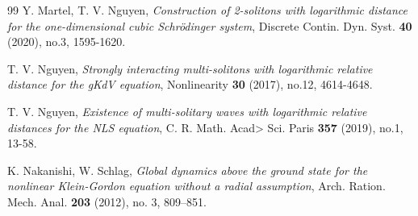 \documentclass[reqno]{amsart}
\theoremstyle{plain}
\theoremstyle{definition}
\numberwithin{equation}{section}
\newcommand{\1}{\mathbbm{1}}
\begin{document}
\begin{thebibliography}{99}
 Y. Martel, T. V. Nguyen,
\textit{Construction of 2-solitons with logarithmic distance for the one-dimensional cubic Schr\"{o}dinger system},
Discrete Contin. Dyn. Syst. \textbf{40} (2020), no.3, 1595-1620.

 T. V. Nguyen,
\textit{Strongly interacting multi-solitons with logarithmic relative distance for the gKdV equation},
Nonlinearity \textbf{30} (2017), no.12, 4614-4648.


 T. V. Nguyen,
\textit{Existence of multi-solitary waves with logarithmic relative distances for the NLS equation},
C. R. Math. Acad> Sci. Paris \textbf{357} (2019), no.1, 13-58.



K. Nakanishi, W. Schlag, 
\textit{Global dynamics above the ground state for the nonlinear Klein-Gordon equation without a radial assumption}, 
Arch. Ration. Mech. Anal. 
{\bf 203} (2012), no. 3, 809--851. 







\end{thebibliography}
\end{document}
